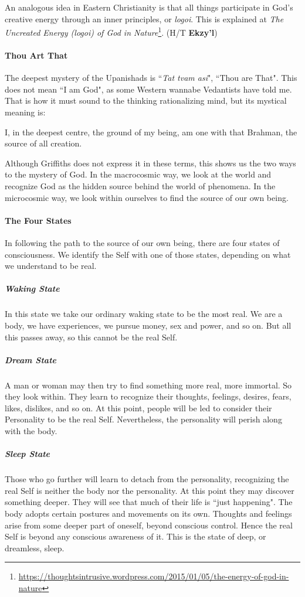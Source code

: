 An analogous idea in Eastern Christianity is that all things participate in God's creative energy through an inner principles, or \emph{logoi}. This is explained at \textit{The Uncreated Energy (logoi) of God in Nature}\footnote{\url{https://thoughtsintrusive.wordpress.com/2015/01/05/the-energy-of-god-in-nature}}. (H/T \textbf{Ekzy'l})

\paragraph{Thou Art That}
The deepest mystery of the Upanishads is ``\emph{Tat tvam asi}", ``Thou are That". This does not mean ``I am God", as some Western wannabe Vedantists have told me. That is how it must sound to the thinking rationalizing mind, but its mystical meaning is:

\begin{quotex}
I, in the deepest centre, the ground of my being, am one with that Brahman, the source of all creation. 

\end{quotex}
Although Griffiths does not express it in these terms, this shows us the two ways to the mystery of God. In the macrocosmic way, we look at the world and recognize God as the hidden source behind the world of phenomena. In the microcosmic way, we look within ourselves to find the source of our own being.

\paragraph{The Four States}
In following the path to the source of our own being, there are four states of consciousness. We identify the Self with one of those states, depending on what we understand to be real.

\subparagraph{Waking State}
In this state we take our ordinary waking state to be the most real. We are a body, we have experiences, we pursue money, sex and power, and so on. But all this passes away, so this cannot be the real Self.

\subparagraph{Dream State}
A man or woman may then try to find something more real, more immortal. So they look within. They learn to recognize their thoughts, feelings, desires, fears, likes, dislikes, and so on. At this point, people will be led to consider their Personality to be the real Self. Nevertheless, the personality will perish along with the body.

\subparagraph{Sleep State}
Those who go further will learn to detach from the personality, recognizing the real Self is neither the body nor the personality. At this point they may discover something deeper. They will see that much of their life is ``just happening". The body adopts certain postures and movements on its own. Thoughts and feelings arise from some deeper part of oneself, beyond conscious control. Hence the real Self is beyond any conscious awareness of it. This is the state of deep, or dreamless, sleep.

